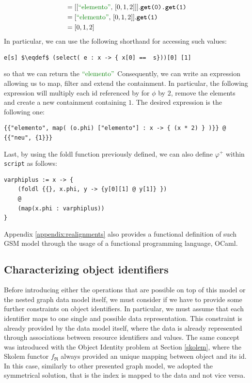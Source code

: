 \begin{example}
\begin{align*}
	&= [[\mstr{elemento},\, [0,1,2]]].\texttt{\textbf{get}(0).\textbf{get}(1)}\\
	&= [\mstr{elemento},\, [0,1,2]].\texttt{\textbf{get}(1)}\\
	&= [0,1,2]\\
	\end{align*}
	In particular, we can use the following shorthand for accessing such values:
\begin{lstlisting}[language=Script,mathescape=true]
e[s] $\eqdef$ (select( e : x -> { x[0] ==  s}))[0] [1]
\end{lstlisting}
	so that we can return the  $\mstr{elemento}$  Consequently, we can write an expression allowing us to map, filter and extend the containment. In particular, the following expression will multiply each id referenced by  for $\phi$ by $2$, remove the  elements and create a new containment  containing $1$. The desired expression is the following one:
\begin{lstlisting}[language=Script]
{{"elemento", map( (o.phi) ["elemento"] : x -> { (x * 2) } )}} @ {{"neu", {1}}}
\end{lstlisting}
\end{example}

Last, by using the foldl function previously defined, we can also define $\varphi^+$ within \texttt{script} as follows:
\begin{lstlisting}[language=Script]
varphiplus := x -> {
	(foldl {{}, x.phi, y -> {y[0][1] @ y[1]} })
	@
	(map(x.phi : varphiplus))
}
\end{lstlisting}

Appendix \vref{appendix:realignments} also provides a functional definition of such GSM model through the usage of a functional programming language, OCaml.

\subsection{Characterizing object identifiers}
Before introducing either the operations that are possible on top of this model or the nested graph data model itself, we must consider if we have to provide some further constraints on  object identifiers. In particular, we must assume that each identifier maps to one single and possible data representation.
This constraint is already provided by the data model itself, where the data is already represented through associations between resource identifiers and values. The same concept was introduced with the Object Identity problem at Section \vref{skolem}, where the Skolem functor $f_\Re$  always provided an unique mapping between object and its id. In this case, similarly to other presented graph model, we adopted the symmetrical solution, that is the index is mapped to the data and not vice versa.

